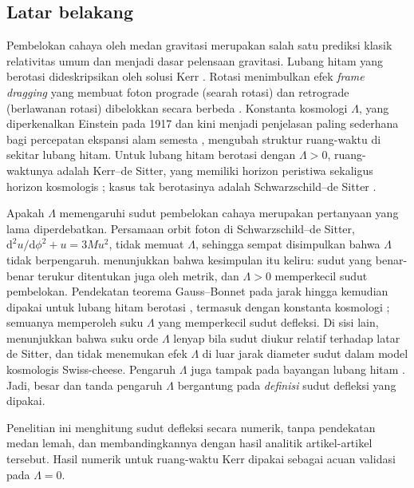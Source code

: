 \documentclass[11pt,a4paper]{article}
\newcommand{\dd}{\mathrm{d}}
\begin{document}
\subsection{Latar belakang}

Pembelokan cahaya oleh medan gravitasi merupakan salah satu prediksi klasik relativitas umum dan menjadi
dasar pelensaan gravitasi. Lubang hitam yang berotasi dideskripsikan oleh solusi Kerr
\citep{kerr1963gravitational,teukolsky2015kerr}. Rotasi menimbulkan efek \emph{frame dragging} yang membuat
foton prograde (searah rotasi) dan retrograde (berlawanan rotasi) dibelokkan secara berbeda
\citep{congdon2022asymmetric}. Konstanta kosmologi $\Lambda$, yang diperkenalkan Einstein pada 1917 dan
kini menjadi penjelasan paling sederhana bagi percepatan ekspansi alam semesta
\citep{ferrara2017einstein,cohen2018lambda}, mengubah struktur ruang-waktu di sekitar lubang hitam. Untuk
lubang hitam berotasi dengan $\Lambda > 0$, ruang-waktunya adalah Kerr--de Sitter, yang memiliki horizon
peristiwa sekaligus horizon kosmologis \citep{li2017entropy,ovalle2021kerr,hackmann2010geodesic}; kasus
tak berotasinya adalah Schwarzschild--de Sitter \citep{latief2023sifat}.

Apakah $\Lambda$ memengaruhi sudut pembelokan cahaya merupakan pertanyaan yang lama diperdebatkan.
Persamaan orbit foton di Schwarzschild--de Sitter, $\dd^2u/\dd\phi^2 + u = 3Mu^2$, tidak memuat $\Lambda$,
sehingga sempat disimpulkan bahwa $\Lambda$ tidak berpengaruh. \citet{rindler2007contribution}
menunjukkan bahwa kesimpulan itu keliru: sudut yang benar-benar terukur ditentukan juga oleh metrik, dan
$\Lambda > 0$ memperkecil sudut pembelokan. Pendekatan teorema Gauss--Bonnet pada jarak hingga
\citep{ishihara2016gravitational,arakida2018light} kemudian dipakai untuk lubang hitam berotasi
\citep{jusufi2018gravitational,jusufi2018deflection}, termasuk dengan konstanta kosmologi
\citep{belhaj2022light,huang2025influence,pantig2024testing}; semuanya memperoleh suku $\Lambda$ yang
memperkecil sudut defleksi. Di sisi lain, \citet{arakida2018light} menunjukkan bahwa suku orde $\Lambda$
lenyap bila sudut diukur relatif terhadap latar de Sitter, dan \citet{hu2022light} tidak menemukan efek
$\Lambda$ di luar jarak diameter sudut dalam model kosmologis Swiss-cheese. Pengaruh $\Lambda$ juga
tampak pada bayangan lubang hitam \citep{afrin2022estimating,pantig2024testing}. Jadi, besar dan tanda
pengaruh $\Lambda$ bergantung pada \emph{definisi} sudut defleksi yang dipakai.

Penelitian ini menghitung sudut defleksi secara numerik, tanpa pendekatan medan lemah, dan
membandingkannya dengan hasil analitik artikel-artikel tersebut. Hasil numerik
\citet{hasanuddin2012pembelokan} untuk ruang-waktu Kerr dipakai sebagai acuan validasi pada $\Lambda = 0$.
\end{document}
